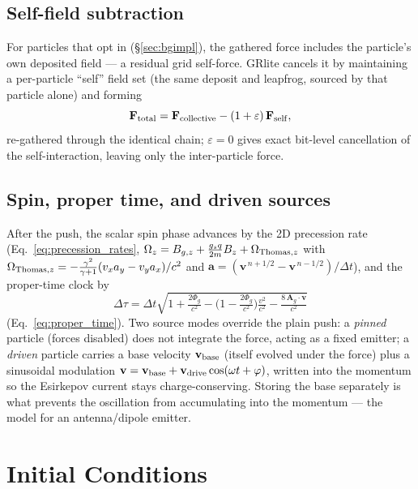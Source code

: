 \documentclass[11pt]{article}
\newcommand{\Phig}{\Phi_g}                 %
\newcommand{\Ag}{\mathbf{A}_g}             %
\newcommand{\vv}[1]{\mathbf{#1}}           %
\newcommand{\dt}{\Delta t}                 %
\begin{document}
\subsection{Self-field subtraction}

For particles that opt in (\S\ref{sec:bgimpl}), the gathered force includes the
particle's own deposited field --- a residual grid self-force. GRlite cancels it
by maintaining a per-particle ``self'' field set (the same deposit and leapfrog,
sourced by that particle alone) and forming
\begin{equation}
\label{eq:selffield}
  \vv F_{\rm total} = \vv F_{\rm collective} - (1+\varepsilon)\,\vv F_{\rm self},
\end{equation}
re-gathered through the identical chain; $\varepsilon=0$ gives exact bit-level
cancellation of the self-interaction, leaving only the inter-particle force.

\subsection{Spin, proper time, and driven sources}

After the push, the scalar spin phase advances by the 2D precession rate
(Eq.~\eqref{eq:precession_rates}, $\Omega_z=B_{g,z}+\tfrac{g_sq}{2m}B_z+
\Omega_{{\rm Thomas},z}$ with $\Omega_{{\rm Thomas},z}=-\tfrac{\gamma^2}{\gamma+1}
(v_xa_y-v_ya_x)/c^2$ and $\vv a=(\vv v^{\,n+1/2}-\vv v^{\,n-1/2})/\dt$), and the
proper-time clock by
\begin{equation}
  \Delta\tau = \dt\sqrt{1+\tfrac{2\Phig}{c^2}-\bigl(1-\tfrac{2\Phig}{c^2}\bigr)\tfrac{v^2}{c^2}-\tfrac{8\,\Ag\cdot\vv v}{c^2}}
\end{equation}
(Eq.~\eqref{eq:proper_time}). Two source modes override the plain push: a
\emph{pinned} particle (forces disabled) does not integrate the force, acting as
a fixed emitter; a \emph{driven} particle carries a base velocity $\vv v_{\rm
base}$ (itself evolved under the force) plus a sinusoidal modulation $\vv v=\vv
v_{\rm base}+\vv v_{\rm drive}\cos(\omega t+\varphi)$, written into the momentum
so the Esirkepov current stays charge-conserving. Storing the base separately is
what prevents the oscillation from accumulating into the momentum --- the model
for an antenna/dipole emitter.

\section{Initial Conditions}
\label{sec:init}
\end{document}
